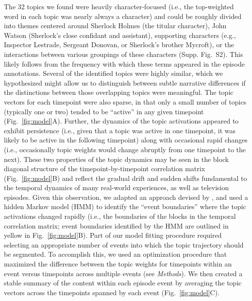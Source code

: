 \documentclass[10pt]{article}
\newcommand{\topics}{S2}
\begin{document}
The 32 topics we found were heavily character-focused (i.e., the top-weighted word in each topic was nearly always a character) and could be roughly divided into themes centered around Sherlock Holmes (the titular character), John Watson (Sherlock's close confidant and assistant), supporting characters (e.g., Inspector Lestrade, Sergeant Donovan, or Sherlock's brother Mycroft), or the interactions between various groupings of these characters (Supp. Fig.~\topics).  This likely follows from the frequency with which these terms appeared in the episode annotations.  Several of the identified topics were highly similar, which we hypothesized might allow us to distinguish between subtle narrative differences if the distinctions between those overlapping topics were meaningful.  The topic vectors for each timepoint were also sparse, in that only a small number of topics (typically one or two) tended to be ``active'' in any given timepoint (Fig.~\ref{fig:model}A).  Further, the dynamics of the topic activations appeared to exhibit persistence (i.e., given that a topic was active in one timepoint, it was likely to be active in the following timepoint) along with occasional rapid changes (i.e., occasionally topic weights would change abruptly from one timepoint to the next).  These two properties of the topic dynamics may be seen in the block diagonal structure of the timepoint-by-timepoint correlation matrix (Fig.~\ref{fig:model}B) and reflect the gradual drift and sudden shifts fundamental to the temporal dynamics of many real-world experiences, as well as television episodes.  Given this observation, we adapted an approach devised by \cite{BaldEtal17}, and used a hidden Markov model (HMM) to identify the ``event boundaries'' where the topic activations changed rapidly (i.e., the boundaries of the blocks in the temporal correlation matrix; event boundaries identified by the HMM are outlined in yellow in Fig.~\ref{fig:model}B).  Part of our model fitting procedure required selecting an appropriate number of events into which the topic trajectory should be segmented.  To accomplish this, we used an optimization procedure that maximized the difference between the topic weights for timepoints within an event versus timepoints across multiple events (see \textit{Methods}).  We then created a stable summary of the content within each episode event by averaging the topic vectors across the timepoints spanned by each event (Fig.~\ref{fig:model}C).
\end{document}
